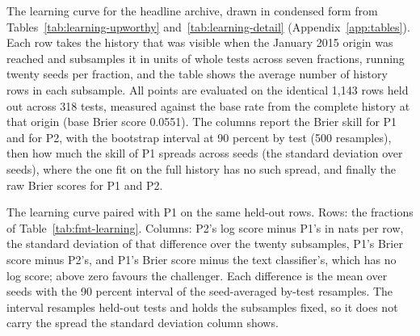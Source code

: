 \begin{table}[t]\centering\scriptsize
\caption{The learning curve for the headline archive, drawn in condensed form from Tables~\ref{tab:learning-upworthy} and~\ref{tab:learning-detail} (Appendix~\ref{app:tables}). Each row takes the history that was visible when the January 2015 origin was reached and subsamples it in units of whole tests across seven fractions, running twenty seeds per fraction, and the table shows the average number of history rows in each subsample. All points are evaluated on the identical 1,143 rows held out across 318 tests, measured against the base rate from the complete history at that origin (base Brier score 0.0551). The columns report the Brier skill for P1 and for P2, with the bootstrap interval at 90 percent by test (500 resamples), then how much the skill of P1 spreads across seeds (the standard deviation over seeds), where the one fit on the full history has no such spread, and finally the raw Brier scores for P1 and P2.}
\label{tab:fmt-learning}

\end{table}

\begin{table}[t]\centering\scriptsize
\caption{The learning curve paired with P1 on the same held-out rows. Rows: the fractions of Table~\ref{tab:fmt-learning}. Columns: P2's log score minus P1's in nats per row, the standard deviation of that difference over the twenty subsamples, P1's Brier score minus P2's, and P1's Brier score minus the text classifier's, which has no log score; above zero favours the challenger. Each difference is the mean over seeds with the 90 percent interval of the seed-averaged by-test resamples. The interval resamples held-out tests and holds the subsamples fixed, so it does not carry the spread the standard deviation column shows.}
\label{tab:fmt-learning-paired}
\resizebox{\columnwidth}{!}{}
\end{table}

